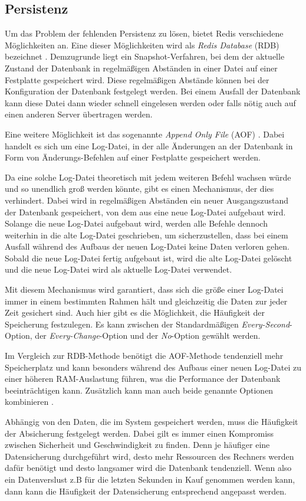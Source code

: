 
\subsection{Persistenz}
\label{sec:Persistenz}
Um das Problem der fehlenden Persistenz zu lösen, bietet Redis verschiedene Möglichkeiten an.
Eine dieser Möglichkeiten wird als \textit{Redis Database} (RDB) bezeichnet \cite{Redis-Docs-Persistenz}. 
Demzugrunde liegt ein Snapshot-Verfahren, bei dem der aktuelle Zustand der Datenbank in regelmäßigen Abständen in einer Datei auf einer Festplatte gespeichert wird.
Diese regelmäßigen Abstände können bei der Konfiguration der Datenbank festgelegt werden. 
Bei einem Ausfall der Datenbank kann diese Datei dann wieder schnell eingelesen werden oder falls nötig auch auf einen anderen Server übertragen werden.

Eine weitere Möglichkeit ist das sogenannte \textit{Append Only File} (AOF) \cite{Redis-Docs-Persistenz}. 
Dabei handelt es sich um eine Log-Datei, in der alle Änderungen an der Datenbank in Form von Änderungs-Befehlen auf einer Festplatte gespeichert werden.

Da eine solche Log-Datei theoretisch mit jedem weiteren Befehl wachsen würde und so unendlich groß werden könnte, gibt es einen Mechanismus, der dies verhindert.
Dabei wird in regelmäßigen Abständen ein neuer Ausgangszustand der Datenbank gespeichert, von dem aus eine neue Log-Datei aufgebaut wird. 
Solange die neue Log-Datei aufgebaut wird, werden alle Befehle dennoch weiterhin in die alte Log-Datei geschrieben, um sicherzustellen, dass bei einem Ausfall während des Aufbaus der neuen Log-Datei keine Daten verloren gehen.
Sobald die neue Log-Datei fertig aufgebaut ist, wird die alte Log-Datei gelöscht und die neue Log-Datei wird als aktuelle Log-Datei verwendet.

Mit diesem Mechanismus wird garantiert, dass sich die größe einer Log-Datei immer in einem bestimmten Rahmen hält und gleichzeitig die Daten zur jeder Zeit gesichert sind.
Auch hier gibt es die Möglichkeit, die Häufigkeit der Speicherung festzulegen. Es kann zwischen der Standardmäßigen \textit{Every-Second}-Option, der \textit{Every-Change}-Option und der \textit{No}-Option gewählt werden.

Im Vergleich zur RDB-Methode benötigt die AOF-Methode tendenziell mehr Speicherplatz und kann besonders während des Aufbaus einer neuen Log-Datei zu einer höheren RAM-Auslastung führen, was die Performance der Datenbank beeinträchtigen kann.
Zusätzlich kann man auch beide genannte Optionen kombinieren \cite{Redis-Docs-Persistenz}.

Abhängig von den Daten, die im System gespeichert werden, muss die Häufigkeit der Absicherung festgelegt werden.
Dabei gilt es immer einen Kompromiss zwischen Sicherheit und Geschwindigkeit zu finden.
Denn je häufiger eine Datensicherung durchgeführt wird, desto mehr Ressourcen des Rechners werden dafür benötigt und desto langsamer wird die Datenbank tendenziell.
Wenn also ein Datenverslust z.B für die letzten Sekunden in Kauf genommen werden kann, dann kann die Häufigkeit der Datensicherung entsprechend angepasst werden.


